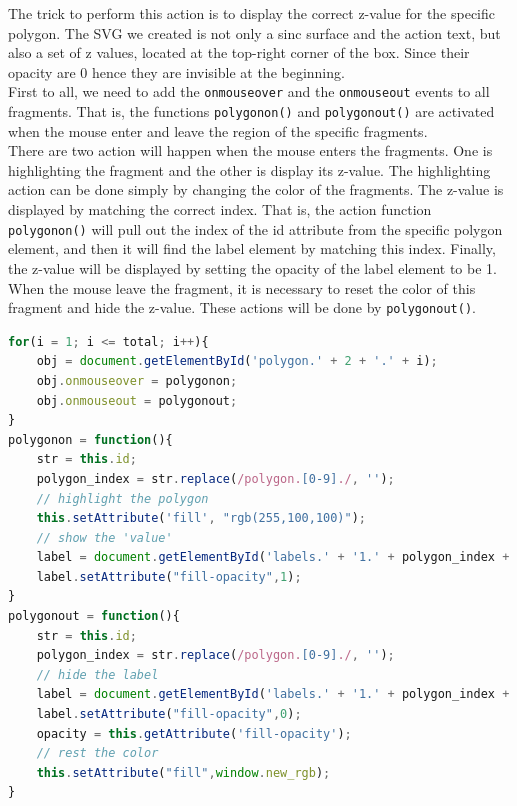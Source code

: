 \documentclass{report}
\begin{document}
The trick to perform this action is to display the correct z-value for the specific polygon. The SVG we created is not only a sinc surface and the action text, but also a set of z values, located at the top-right corner of the box. Since their opacity are 0 hence they are invisible at the beginning.\\

First to all, we need to add the \texttt{onmouseover} and the \texttt{onmouseout} events to all fragments. That is, the functions \texttt{polygonon()} and \texttt{polygonout()} are activated when the mouse enter and leave the region of the specific fragments.\\

There are two action will happen when the mouse enters the fragments. One is highlighting the fragment and the other is display its z-value. The highlighting action can be done simply by changing the color of the fragments. The z-value is displayed by matching the correct index. That is, the action function \texttt{polygonon()} will pull out the index of the id attribute from the specific polygon element, and then it will find the label element by matching this index. Finally, the z-value will be displayed by setting the opacity of the label element to be 1. When the mouse leave the fragment, it is necessary to reset the color of this fragment and hide the z-value. These actions will be done by \texttt{polygonout()}.
\newpage
\begin{lstlisting}[language = JavaScript]
for(i = 1; i <= total; i++){
    obj = document.getElementById('polygon.' + 2 + '.' + i);
    obj.onmouseover = polygonon;
    obj.onmouseout = polygonout;
}
polygonon = function(){
    str = this.id;
    polygon_index = str.replace(/polygon.[0-9]./, '');
    // highlight the polygon
    this.setAttribute('fill', "rgb(255,100,100)");
    // show the 'value'
    label = document.getElementById('labels.' + '1.' + polygon_index + '.text');
    label.setAttribute("fill-opacity",1);
}
polygonout = function(){
    str = this.id;
    polygon_index = str.replace(/polygon.[0-9]./, '');
    // hide the label
    label = document.getElementById('labels.' + '1.' + polygon_index + '.text');
    label.setAttribute("fill-opacity",0);
    opacity = this.getAttribute('fill-opacity');
    // rest the color
    this.setAttribute("fill",window.new_rgb);
}
\end{lstlisting}
\end{document}
